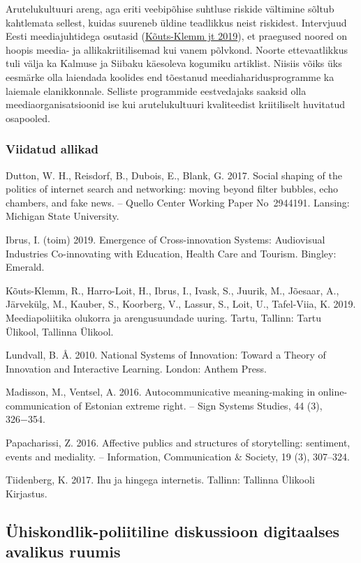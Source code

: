 \documentclass[estonian,]{article}
\begin{document}
Arutelukultuuri areng, aga eriti veebipõhise suhtluse riskide vältimine sõltub kahtlemata sellest, kuidas suureneb üldine teadlikkus neist riskidest. Intervjuud Eesti meediajuhtidega osutasid (\protect\hyperlink{Kuxf5uts-Klemm2019}{Kõuts-Klemm jt 2019}), et praegused noored on hoopis meedia- ja allikakriitilisemad kui vanem põlvkond. Noorte ettevaatlikkus tuli välja ka Kalmuse ja Siibaku käesoleva kogumiku artiklist. Niisiis võiks üks eesmärke olla laiendada koolides end tõestanud meediaharidusprogramme ka laiemale elanikkonnale. Selliste programmide eestvedajaks saaksid olla meediaorganisatsioonid ise kui arutelukultuuri kvaliteedist kriitiliselt huvitatud osapooled.

\hypertarget{viidatud-allikad-16}{%
\subsubsection*{Viidatud allikad}\label{viidatud-allikad-16}}

Dutton, W. H., Reisdorf, B., Dubois, E., Blank, G. 2017. Social shaping of the politics of internet search and networking: moving beyond filter bubbles, echo chambers, and fake news. -- Quello Center Working Paper No~2944191. Lansing: Michigan State University.

Ibrus, I. (toim) 2019. Emergence of Cross-innovation Systems: Audiovisual Industries Co-innovating with Education, Health Care and Tourism. Bingley: Emerald.

Kõuts-Klemm, R., Harro-Loit, H., Ibrus, I., Ivask, S., Juurik, M., Jõesaar, A., Järvekülg, M., Kauber, S., Koorberg, V., Lassur, S., Loit, U., Tafel-Viia, K. 2019. Meediapoliitika olukorra ja arengusuundade uuring. Tartu, Tallinn: Tartu Ülikool, Tallinna Ülikool.

Lundvall, B. Å. 2010. National Systems of Innovation: Toward a Theory of Innovation and Interactive Learning. London: Anthem Press.

Madisson, M., Ventsel, A. 2016. Autocommunicative meaning-making in online-communication of Estonian extreme right. -- Sign Systems Studies, 44 (3), 326−354.

Papacharissi, Z. 2016. Affective publics and structures of storytelling: sentiment, events and mediality. -- Information, Communication \& Society, 19 (3), 307--324.

Tiidenberg, K. 2017. Ihu ja hingega internetis. Tallinn: Tallinna Ülikooli Kirjastus.

\hypertarget{uxfchiskondlik-poliitiline-diskussioon-digitaalses-avalikus-ruumis}{%
\subsection{Ühiskondlik-poliitiline diskussioon digitaalses avalikus ruumis}\label{uxfchiskondlik-poliitiline-diskussioon-digitaalses-avalikus-ruumis}}
\end{document}
